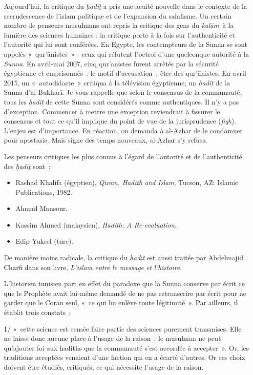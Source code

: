 Aujourd'hui, la critique du \emph{ḥadīṯ} a pris une acuité nouvelle dans
le contexte de la recrudescence de l'islam politique et de l'expansion
du salafisme. Un certain nombre de penseurs musulmans ont repris la
critique des gens du \emph{kalām}~à la lumière des sciences humaines :
la critique porte à la fois sur l'authenticité et l'autorité qui lui
sont conférées. En Egypte, les contempteurs de la Sunna se sont appelés
«~qur'ānistes~» - ceux qui réfutent l'octroi d'une quelconque autorité à
la \emph{Sunna}. En avril-mai 2007, cinq qur'anistes furent arrêtés par
la sécurité égyptienne et emprisonnés~: le motif d'accusation~: être des
qur'ānistes. En avril 2015, un «~autodidacte~» critiqua à la télévision
égyptienne, un \emph{ḥadīṯ} de la Sunna d'al-Bukharī. Je vous rappelle
que selon le consensus de la communauté, tous les \emph{ḥadīṯ} de cette
Sunna sont considérés comme authentiques. Il n'y a pas d'exception.
Commencer à mettre une exception reviendrait à fissurer le consensus et
tout ce qu'il implique du point de vue de la jurisprudence
(\emph{fiqh}). L'enjeu est d'importance. En réaction, on demanda à
al-Azhar de le condamner pour apostasie. Mais signe des temps nouveaux,
al-Azhar s'y refusa.

Les penseurs critiques les plus connus à l'égard de l'autorité et de
l'authenticité des \emph{ḥadīṯ} sont~:

\begin{itemize}
\item
  Rashad Khalifa (égyptien), \emph{Quran, Hadith and Islam}, Tucson, AZ:
  Islamic Publications, 1982.
\item
  Ahmad Mansour.
\item
  Kassim Ahmed (malaysien), \emph{Hadith: A Re-evaluation.}
\item
  Edip Yuksel (turc).
\end{itemize}

De manière moins radicale, la critique du \emph{ḥadīṯ} est aussi traitée
par Abdelmajid Charfi dans son livre, \emph{L'islam entre le message et
l'histoire}.

L'historien tunisien part en effet du paradoxe que la Sunna conserve par
écrit ce que le Prophète avait lui-même demandé de ne pas retranscrire
par écrit pour ne garder que le Coran seul, «~ce qui lui enlève toute
légitimité~». Par ailleurs, il établit
trois constats~:

1/ «~cette science est censée faire partie des sciences purement
transmises. Elle ne laisse donc aucune place à l'usage de la raison~: le
musulman ne peut qu'ajouter foi aux hadiths que la communauté s'est
accordée à accepter~». Or, les traditions acceptées venaient d'une
faction qui en a écarté d'autres. Or ces choix doivent être étudiés,
critiqués, ce qui nécessite l'usage de la raison.

